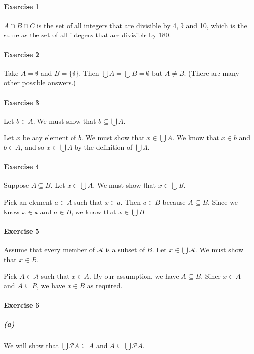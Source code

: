 \documentclass{report}
\begin{document}
    \paragraph{Exercise 1}
    $A \cap B \cap C$ is the set of all integers that are divisible by 4, 9 and 10,
    which is the same as the set of all integers that are divisible by 180.

    \paragraph{Exercise 2}
    Take $A = \emptyset$ and $B = \{ \emptyset \}$. Then $\bigcup A = \bigcup B = \emptyset$
    but $A \neq B$. (There are many other possible answers.)

    \paragraph{Exercise 3}
    Let $b \in A$. We must show that $b \subseteq \bigcup A$.

    Let $x$ be any element of $b$. We must show that $x \in \bigcup A$. We know that $x \in b$ and $b \in A$,
    and so $x \in \bigcup A$ by the definition of $\bigcup A$.

    \paragraph{Exercise 4}
    Suppose $A \subseteq B$. Let $x \in \bigcup A$. We must show that $x \in \bigcup B$.

    Pick an element $a \in A$ such that $x \in a$. Then $a \in B$ because $A \subseteq B$. Since we know
    $x \in a$ and $a \in B$, we know that $x \in \bigcup B$.

    \paragraph{Exercise 5}
    Assume that every member of $\mathcal{A}$ is a subset of $B$. Let $x \in \bigcup \mathcal{A}$.
    We must show that $x \in B$.

    Pick $A \in \mathcal{A}$ such that $x \in A$. By our assumption, we have $A \subseteq B$. Since $x \in A$
    and $A \subseteq B$, we have $x \in B$ as required.

    \paragraph{Exercise 6}
    \subparagraph{(a)}We will show that $\bigcup \mathcal{P} A \subseteq A$ and $A \subseteq \bigcup \mathcal{P} A$.
\end{document}
